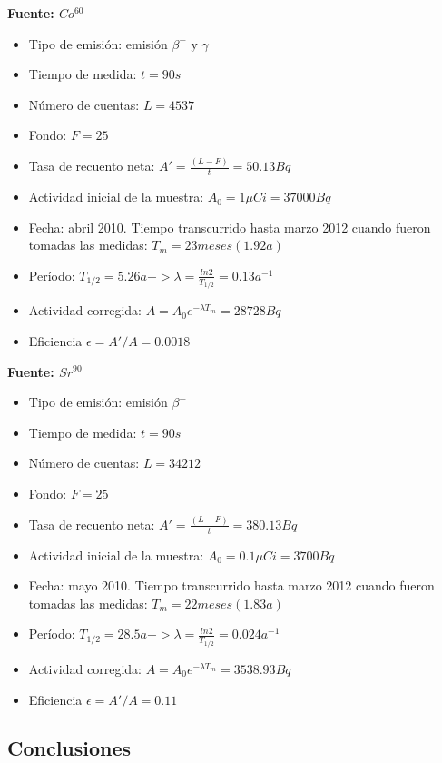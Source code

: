 \documentclass[11pt]{article}
\begin{document}
    \textbf{Fuente: \(Co^{60}\)}

\begin{itemize}
\item
  Tipo de emisión: emisión \(\beta^{-}\) y \(\gamma\)
\item
  Tiempo de medida: \(t=90s\)
\item
  Número de cuentas: \(L=4537\)
\item
  Fondo: \(F = 25\)
\item
  Tasa de recuento neta: \(A'= \frac{(L-F)}{t} = 50.13 Bq\)
\item
  Actividad inicial de la muestra: \(A_0 = 1 \mu Ci = 37000 Bq\)
\item
  Fecha: abril 2010. Tiempo transcurrido hasta marzo 2012 cuando fueron
  tomadas las medidas: \(T_m = 23 meses (1.92 a)\)
\item
  Período:
  \(T_{1/2} = 5.26 a -> \lambda = \frac{ln2}{T_{1/2}} = 0.13 a^{-1}\)
\item
  Actividad corregida: \(A = A_0e^{- \lambda T_m} = 28728 Bq\)
\item
  Eficiencia \(\epsilon = A'/A = 0.0018\)
\end{itemize}

    \textbf{Fuente: \(Sr^{90}\)}

\begin{itemize}
\item
  Tipo de emisión: emisión \(\beta^{-}\)
\item
  Tiempo de medida: \(t=90s\)
\item
  Número de cuentas: \(L=34212\)
\item
  Fondo: \(F = 25\)
\item
  Tasa de recuento neta: \(A'= \frac{(L-F)}{t} = 380.13 Bq\)
\item
  Actividad inicial de la muestra: \(A_0 = 0.1 \mu Ci = 3700 Bq\)
\item
  Fecha: mayo 2010. Tiempo transcurrido hasta marzo 2012 cuando fueron
  tomadas las medidas: \(T_m = 22 meses (1.83 a)\)
\item
  Período:
  \(T_{1/2} = 28.5 a -> \lambda = \frac{ln2}{T_{1/2}} = 0.024 a^{-1}\)
\item
  Actividad corregida: \(A = A_0e^{- \lambda T_m} = 3538.93 Bq\)
\item
  Eficiencia \(\epsilon = A'/A = 0.11\)
\end{itemize}

    \hypertarget{conclusiones}{%
\subsection{Conclusiones}\label{conclusiones}}
\end{document}
